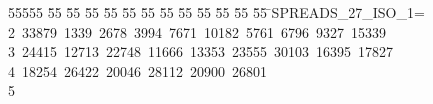 %
%
\begin{tabbing}
55555 \= 55 \= 55 \= 55 \= 55 \= 55 \= 55 \= 55 \= 55 \= 55 \= 55 \= 55 \= 55 \= \>SPREADS\_27\_ISO\_1=\\[0pt]
2\ 33879\ 1339\ 2678\ 3994\ 7671\ 10182\ 5761\ 6796\ 9327\ 15339\ \\[0pt]
3\ 24415\ 12713\ 22748\ 11666\ 13353\ 23555\ 30103\ 16395\ 17827\ \\[0pt]
4\ 18254\ 26422\ 20046\ 28112\ 20900\ 26801\\[0pt]
5\>\end{tabbing}
